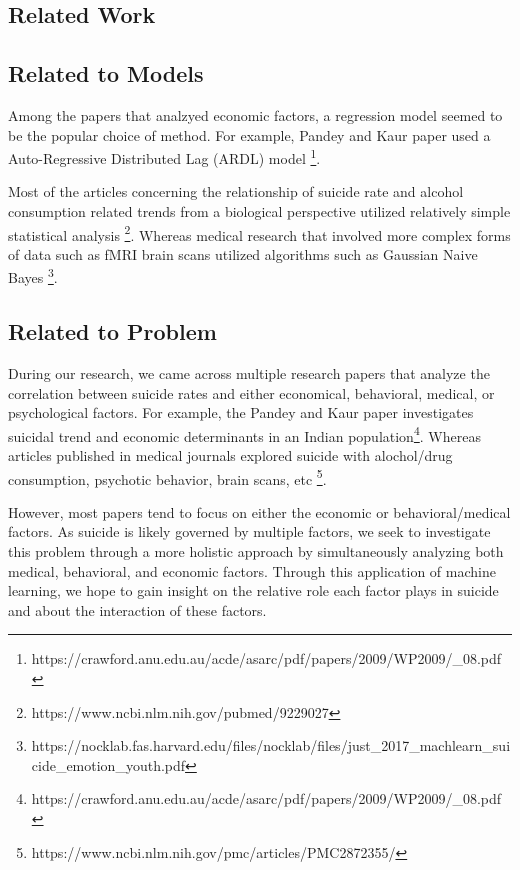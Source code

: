 \documentclass{article}
\begin{document}
\begin{multicols}{2}


\section{Related Work}
\subsection{Related to Models} 

Among the papers that analzyed economic factors, a regression model seemed to be the popular choice of method. For example, Pandey and Kaur paper used a Auto-Regressive Distributed Lag (ARDL) model \footnote{https://crawford.anu.edu.au/acde/asarc/pdf/papers/2009/WP2009/{\_}08.pdf}. 

Most of the articles concerning the relationship of suicide rate and alcohol consumption related trends from a biological perspective utilized relatively simple statistical analysis \footnote{https://www.ncbi.nlm.nih.gov/pubmed/9229027}. Whereas medical research that involved more complex forms of data such as fMRI brain scans utilized algorithms such as Gaussian Naive Bayes \footnote{https://nocklab.fas.harvard.edu/files/nocklab/files/just{\_}2017{\_}machlearn{\_}suicide{\_}emotion{\_}youth.pdf}.

\subsection{Related to Problem} 

During our research, we came across multiple research papers that analyze the correlation between suicide rates and either economical, behavioral, medical, or psychological factors. For example, the Pandey and Kaur paper investigates suicidal trend and economic determinants in an Indian population\footnote{https://crawford.anu.edu.au/acde/asarc/pdf/papers/2009/WP2009/{\_}08.pdf}. Whereas articles published in medical journals explored suicide with alochol/drug consumption, psychotic behavior, brain scans, etc \footnote{https://www.ncbi.nlm.nih.gov/pmc/articles/PMC2872355/}. 

However, most papers tend to focus on either the economic or behavioral/medical factors. As suicide is likely governed by multiple factors, we seek to investigate this problem through a more holistic approach by simultaneously analyzing both medical, behavioral, and economic factors. Through this application of machine learning, we hope to gain insight on the relative role each factor plays in suicide and about the interaction of these factors. 


\end{multicols}
\end{document}

